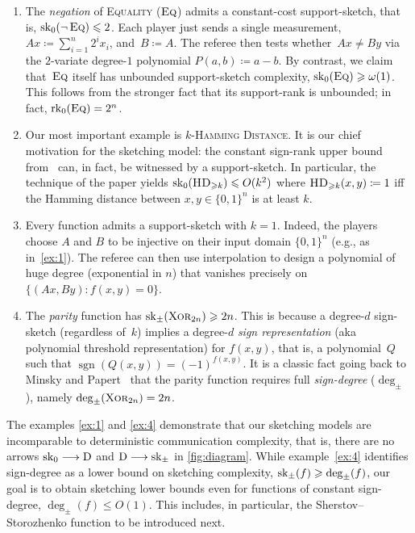 \documentclass{article}
\begin{document}
\begin{enumerate}[label=(E\arabic*),leftmargin=2.5em]
\item \label{ex:1}
The \emph{negation} of \textsc{Equality} ($\operatorname{\textsc{Eq}}$) admits a constant-cost support-sketch, that is, $\operatorname{sk}_0(\neg\operatorname{\textsc{Eq}})\leqslant 2$. Each player just sends a single measurement, $Ax\coloneqq \sum_{i=1}^n2^i x_i$, and~$B\coloneqq A$. The referee then tests whether~$Ax\neq By$ via the $2$-variate degree-$1$ polynomial $P(a,b)\coloneqq a-b$. By contrast, we claim that~$\operatorname{\textsc{Eq}}$ itself has unbounded support-sketch complexity, $\operatorname{sk}_0(\operatorname{\textsc{Eq}})\geqslant\omega(1)$. This follows from the stronger fact that its support-rank is unbounded; in fact, $\operatorname{rk}_0(\operatorname{\textsc{Eq}})=2^n$.

\item \label{ex:2}
Our most important example is \textsc{$k$-Hamming Distance}. It is our chief motivation for the sketching model: the constant sign-rank upper bound from~\cite{GHIS25} can, in fact, be witnessed by a support-sketch.
In particular, the technique of the paper yields $\operatorname{sk}_0(\operatorname{\textsc{HD}}_{\geqslant k})\leqslant O(k^2)$ where $\operatorname{\textsc{HD}}_{\geqslant k}(x,y)\coloneqq 1$ iff the Hamming distance between $x,y\in\{0,1\}^n$ is at least $k$.

\item
Every function admits a support-sketch with $k=1$. Indeed, the players  choose $A$ and $B$ to be injective on their input domain $\{0,1\}^n$ (e.g., as in~\ref{ex:1}). The referee can then use interpolation to design a polynomial of huge degree (exponential in $n$) that vanishes precisely on $\{(Ax,By) : f(x,y)=0\}$.

\item \label{ex:4}
The \emph{parity} function has $\operatorname{sk}_\pm(\operatorname{\textsc{Xor}}_{2n})\geqslant 2n$. This is because a degree-$d$ sign-sketch (regardless of~$k$) implies a degree-$d$ \emph{sign representation} (aka polynomial threshold representation) for $f(x,y)$, that is, a polynomial~$Q$ such that $\operatorname{sgn}(Q(x,y))=(-1)^{f(x,y)}$. It is a classic fact going back to Minsky and Papert~\cite{MP69} that the parity function requires full \emph{sign-degree} ($\deg_\pm$), namely $\deg_\pm(\operatorname{\textsc{Xor}}_{2n})=2n$.
\end{enumerate}
The examples \ref{ex:1} and \ref{ex:4} demonstrate that our sketching models are incomparable to deterministic communication complexity, that is, there are no arrows $\operatorname{sk}_0\longrightarrow\operatorname{D}$ and $\operatorname{D}\longrightarrow\operatorname{sk}_\pm$  in \cref{fig:diagram}. While example~\ref{ex:4} identifies sign-degree as a lower bound on sketching complexity, $\operatorname{sk}_\pm(f)\geqslant\deg_\pm(f)$, our goal is to obtain sketching lower bounds even for functions of constant sign-degree, $\deg_\pm(f)\leq O(1)$. This includes, in particular, the Sherstov--Storozhenko function to be introduced next.
\end{document}
